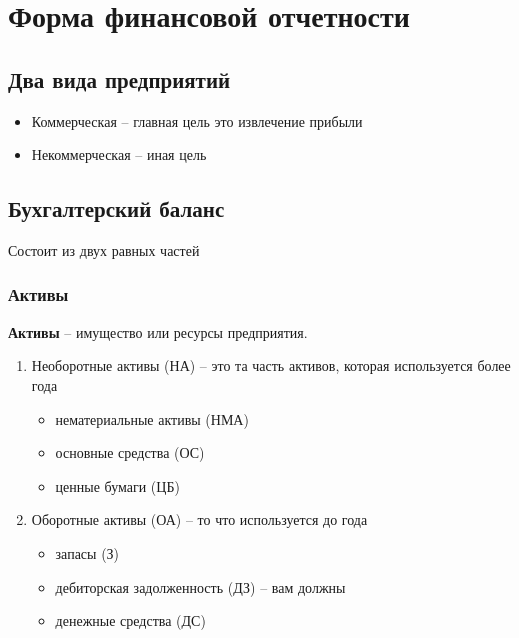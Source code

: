 





\section{Форма финансовой отчетности}

\subsection{Два вида предприятий}

\begin{itemize}
    \item Коммерческая -- главная цель это извлечение прибыли
    \item Некоммерческая -- иная цель
\end{itemize}

\subsection{Бухгалтерский баланс}

Состоит из двух равных частей

\subsubsection{Активы}

\textbf{Активы} -- имущество или ресурсы предприятия. 

\begin{enumerate}
    \item Необоротные активы (НА) -- это та часть активов, которая используется более года

        \begin{itemize}
            \item нематериальные активы (НМА)
            \item основные средства (ОС)
            \item ценные бумаги (ЦБ)
        \end{itemize}

    \item Оборотные активы (ОА) -- то что используется до года

        \begin{itemize}
            \item запасы (З)
            \item дебиторская задолженность (ДЗ) -- вам должны
            \item денежные средства (ДС)
        \end{itemize}
\end{enumerate}

